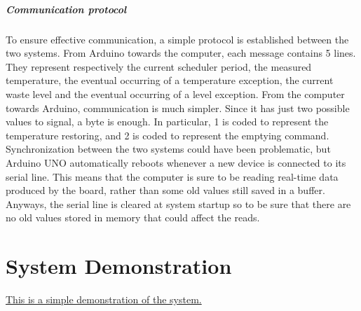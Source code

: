 \documentclass[a4paper,12pt]{report}
\begin{document}
	\paragraph{Communication protocol} To ensure effective communication, a simple protocol is established between the two systems.
	\newline From Arduino towards the computer, each message contains 5 lines. They represent respectively the current scheduler period, the measured temperature, the eventual occurring of a temperature exception, the current waste level and the eventual occurring of a level exception.
	\newline From the computer towards Arduino, communication is much simpler. Since it has just two possible values to signal, a byte is enough. In particular, 1 is coded to represent the temperature restoring, and 2 is coded to represent the emptying command.
	\newline Synchronization between the two systems could have been problematic, but Arduino UNO automatically reboots whenever a new device is connected to its serial line. This means that the computer is sure to be reading real-time data produced by the board, rather than some old values still saved in a buffer. Anyways, the serial line is cleared at system startup so to be sure that there are no old values stored in memory that could affect the reads.
	
	\chapter{System Demonstration}
	\href{https://drive.google.com/file/d/1WgMCrVB_kaROzejK9e0wBk0y-nm3afkx/view?usp=sharing}{This is a simple demonstration of the system.}
	
\end{document}
